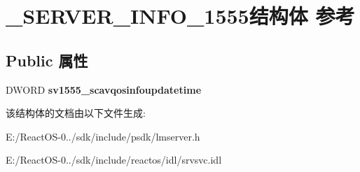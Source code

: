 \hypertarget{struct___s_e_r_v_e_r___i_n_f_o__1555}{}\section{\+\_\+\+S\+E\+R\+V\+E\+R\+\_\+\+I\+N\+F\+O\+\_\+1555结构体 参考}
\label{struct___s_e_r_v_e_r___i_n_f_o__1555}
\subsection*{Public 属性}
\begin{DoxyCompactItemize}
\item 
\mbox{\label{struct___s_e_r_v_e_r___i_n_f_o__1555_ae6f34e386e35c780ce1fc1a3d147bbdb}} 
D\+W\+O\+RD {\bfseries sv1555\+\_\+scavqosinfoupdatetime}
\end{DoxyCompactItemize}


该结构体的文档由以下文件生成\+:\begin{DoxyCompactItemize}
\item 
E\+:/\+React\+O\+S-\/0../sdk/include/psdk/lmserver.\+h\item 
E\+:/\+React\+O\+S-\/0../sdk/include/reactos/idl/srvsvc.\+idl\end{DoxyCompactItemize}
